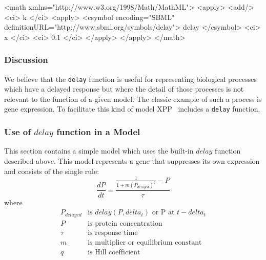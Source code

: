 \documentclass[10pt]{cekarticle}
\begin{document}
\begin{example}
<math xmlns="http://www.w3.org/1998/Math/MathML">
    <apply>
        <add/>
        <ci> k </ci>
        <apply>
            <csymbol encoding="SBML"
                        definitionURL="http://www.sbml.org/symbols/delay">
                delay
            </csymbol>
            <ci> x </ci>
            <ci> 0.1 </ci>
        </apply>
    </apply>
</math>
\end{example}

\subsubsection{Discussion}
\label{sec:delaydiscuss}
We believe that the \texttt{delay} function is useful for representing biological processes which have a delayed response but where the detail of those processes is not relevant to the function of a given model.  The classic example of such a process is gene expression.  To facilitate this kind of model XPP~\citep{ermentrout:2001} includes a \texttt{delay} function.
\subsubsection{Use of $delay$ function in a Model}
\label{sec:delayeg}
This section contains a simple model which uses the built-in $delay$ function described above.  This model represents a gene that suppresses its own expression and consists of the single rule:
\begin{equation*}
\frac{d P}{d t} = \frac{ \frac{1}{1 + m (P_{delayed})^q} - P }{ \tau }
\end{equation*}
where
\begin{equation*}
\begin{array}{rl}
P_{delayed} & \mbox{is } delay(P, delta_t) \mbox{ or P at } t - delta_t\\
P & \mbox{is protein concentration}\\
\tau & \mbox{is response time}\\
m & \mbox{is multiplier or equilibrium constant}\\
q & \mbox{is Hill coefficient}\\ 
\end{array}
\end{equation*}
\end{document}
